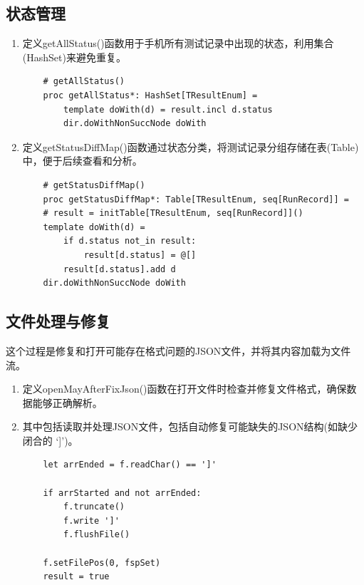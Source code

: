 \documentclass[UTF8]{ctexart}
\begin{document}
	\subsection{状态管理} %
	\begin{enumerate}[leftmargin=3.5em]
		\item 定义getAllStatus()函数用于手机所有测试记录中出现的状态，利用集合(HashSet)来避免重复。
		\begin{tcolorbox}[colback=gray!20, colframe=gray!20, rounded corners, boxrule=-5pt,height=0.08\textheight , width=0.54\textwidth, left=0pt, right=0pt, top=0pt, bottom=0pt]
			\begin{verbatim}
	# getAllStatus()
	proc getAllStatus*: HashSet[TResultEnum] =
		template doWith(d) = result.incl d.status
		dir.doWithNonSuccNode doWith
			\end{verbatim}
		\end{tcolorbox}
		\item 定义getStatusDiffMap()函数通过状态分类，将测试记录分组存储在表(Table)中，便于后续查看和分析。
		\begin{tcolorbox}[colback=gray!20, colframe=gray!20, rounded corners, boxrule=-5pt, height=0.18\textheight, width=0.76\textwidth, left=0pt, right=0pt, top=0pt, bottom=0pt]
			\begin{verbatim}
	# getStatusDiffMap()
	proc getStatusDiffMap*: Table[TResultEnum, seq[RunRecord]] =
	# result = initTable[TResultEnum, seq[RunRecord]]()
	template doWith(d) =
		if d.status not_in result:
			result[d.status] = @[]
		result[d.status].add d
	dir.doWithNonSuccNode doWith
			\end{verbatim}
		\end{tcolorbox}
	\end{enumerate}
	\subsection{文件处理与修复} %
	这个过程是修复和打开可能存在格式问题的JSON文件，并将其内容加载为文件流。
	\begin{enumerate}[leftmargin=3.5em]
		\item 定义openMayAfterFixJson()函数在打开文件时检查并修复文件格式，确保数据能够正确解析。
		\item 其中包括读取并处理JSON文件，包括自动修复可能缺失的JSON结构(如缺少闭合的 ‘]’)。
		\begin{tcolorbox}[colback=gray!20, colframe=gray!20, rounded corners, boxrule=-5pt, height=0.2\textheight, width=0.45\textwidth, left=0pt, right=0pt, top=0pt, bottom=0pt]
			\begin{verbatim}
	let arrEnded = f.readChar() == ']'
				
	if arrStarted and not arrEnded:
		f.truncate()
		f.write ']'
		f.flushFile()
					
	f.setFilePos(0, fspSet)
	result = true
			\end{verbatim}
		\end{tcolorbox}
	\end{enumerate}
\end{document}
